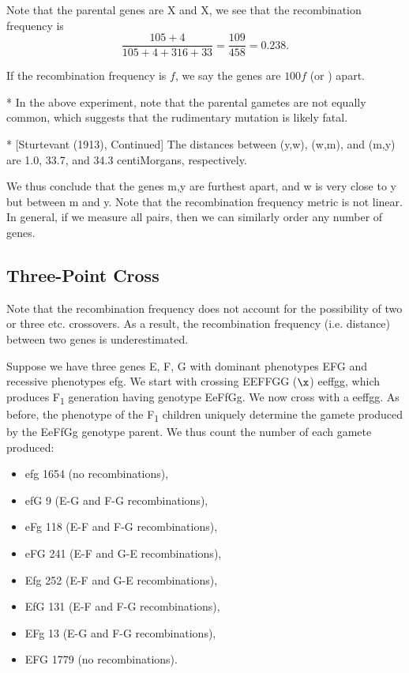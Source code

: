 Note that the parental genes are X and X, we see that the recombination frequency is \[
	\frac{105 + 4}{105 + 4 + 316 + 33} = \frac{109}{458} = 0.238.
\]

\begin{defn}
	If the recombination frequency is $f$, we say the genes are $100f$  (or ) apart.
\end{defn}	

\begin{fact}*
	In the above experiment, note that the parental gametes are not equally common, which suggests that the rudimentary mutation is likely fatal.
\end{fact}

\begin{exm}*
	[Sturtevant (1913), Continued]
	The distances between (y,w), (w,m), and (m,y) are 1.0, 33.7, and 34.3 centiMorgans, respectively. 
\end{exm}

We thus conclude that the genes m,y are furthest apart, and w is very close to y but between m and y. Note that the recombination frequency metric is not linear.
In general, if we measure all pairs, then we can similarly order any number of genes.

\subsection{Three-Point Cross}

Note that the recombination frequency does not account for the possibility of two or three etc. crossovers. As a result, the recombination frequency (i.e. distance) between two genes is underestimated.

\begin{exper}
	Suppose we have three genes E, F, G with dominant phenotypes EFG and recessive phenotypes efg. We start with crossing EEFFGG ($\x$) eeffgg, which produces F\textsubscript1 generation having genotype EeFfGg.
	We now cross with a  eeffgg.
	As before, the phenotype of the F\textsubscript1 children uniquely determine the gamete produced by the EeFfGg genotype parent. 
	We thus count the number of each gamete produced:
	\begin{itemize}
		\item efg 1654 (no recombinations),
		\item efG 9 (E-G and F-G recombinations),
		\item eFg 118 (E-F and F-G recombinations),
		\item eFG 241 (E-F and G-E recombinations),
		\item Efg 252 (E-F and G-E recombinations),
		\item EfG 131 (E-F and F-G recombinations),
		\item EFg 13 (E-G and F-G recombinations),
		\item EFG 1779 (no recombinations).
	\end{itemize}
\end{exper}

